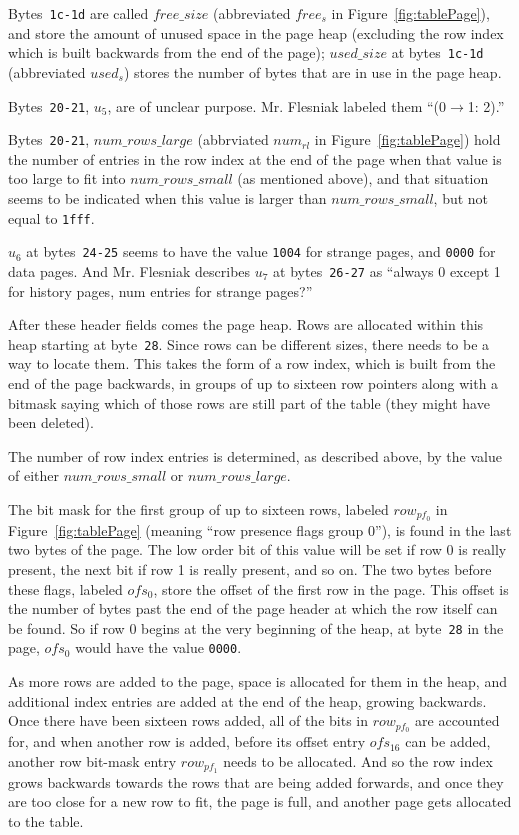\documentclass[11pt]{article}
\begin{document}
Bytes~{\tt 1c-1d} are called $free\_size$ (abbreviated $free_s$ in
Figure~\ref{fig:tablePage}), and store the amount of unused space in
the page heap (excluding the row index which is built backwards from
the end of the page); $used\_size$ at bytes~{\tt 1c-1d} (abbreviated
$used_s$) stores the number of bytes that are in use in the page heap.

Bytes~{\tt 20-21}, $u_5$, are of unclear purpose. Mr. Flesniak labeled
them ``(0$\rightarrow$1: 2).''

Bytes~{\tt 20-21}, $num\_rows\_large$ (abbrviated $num_{rl}$ in
Figure~\ref{fig:tablePage}) hold the number of entries in the row
index at the end of the page when that value is too large to fit into
$num\_rows\_small$ (as mentioned above), and that situation seems to
be indicated when this value is larger than $num\_rows\_small$, but
not equal to {\tt 1fff}.

$u_6$ at bytes~{\tt 24-25} seems to have the value {\tt 1004} for
strange pages, and {\tt 0000} for data pages. And Mr. Flesniak
describes $u_7$ at bytes~{\tt 26-27} as ``always 0 except 1 for
history pages, num entries for strange pages?''

After these header fields comes the page heap. Rows are allocated
within this heap starting at byte~{\tt 28}. Since rows can be
different sizes, there needs to be a way to locate them. This takes
the form of a row index, which is built from the end of the page
backwards, in groups of up to sixteen row pointers along with a
bitmask saying which of those rows are still part of the table (they
might have been deleted).

The number of row index entries is determined, as described above, by
the value of either $num\_rows\_small$ or $num\_rows\_large$.

The bit mask for the first group of up to sixteen rows, labeled
$row_{pf_0}$ in Figure~\ref{fig:tablePage} (meaning ``row presence
flags group 0''), is found in the last two bytes of the page. The low
order bit of this value will be set if row 0 is really present, the
next bit if row 1 is really present, and so on. The two bytes before
these flags, labeled $ofs_0$, store the offset of the first row in the
page. This offset is the number of bytes past the end of the page
header at which the row itself can be found. So if row 0 begins at the
very beginning of the heap, at byte~{\tt 28} in the page, $ofs_0$
would have the value {\tt 0000}.

As more rows are added to the page, space is allocated for them in the
heap, and additional index entries are added at the end of the heap,
growing backwards. Once there have been sixteen rows added, all of the
bits in $row_{pf_0}$ are accounted for, and when another row is added,
before its offset entry $ofs_{16}$ can be added, another row bit-mask
entry $row_{pf_1}$ needs to be allocated. And so the row index grows
backwards towards the rows that are being added forwards, and once
they are too close for a new row to fit, the page is full, and another
page gets allocated to the table.
\end{document}

